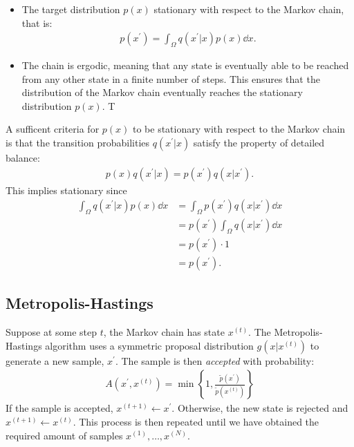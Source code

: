 \begin{itemize}
    \item The target distribution $p(x)$ stationary with respect to the Markov chain, that is:
    \begin{align} \label{eq:stationarity}
        p(x^\prime) = \int_{\Omega} q(x^\prime| x) p(x) \dd{x}.
    \end{align}

    \item The chain is ergodic, meaning that any state is eventually able to be reached from any other state in a finite number of steps. This ensures that the distribution of the Markov chain eventually reaches the stationary distribution $p(x)$. T

\end{itemize}
A sufficent criteria for $p(x)$ to be stationary with respect to the Markov chain is that the transition probabilities $q(x^\prime|x)$ satisfy the property of detailed balance:
\begin{align*}
    p(x)q(x^\prime | x) = p(x^\prime)q(x| x^\prime).
\end{align*}
This implies stationary since
\begin{equation}
    \begin{aligned}    
        \int_{\Omega} q(x^\prime | x) p(x) \dd{x} 
        &= \int_{\Omega}  p(x^\prime)q(x| x^\prime) \dd{x} \\ 
        &=  p(x^\prime) \int_{\Omega} q(x| x^\prime) \dd{x} \\
        &=  p(x^\prime) \cdot 1 \\
        &= p(x^\prime).
    \end{aligned}
\end{equation}
\subsection{Metropolis-Hastings}

Suppose at some step $t$, the Markov chain has state $x^{(t)}$. The Metropolis-Hastings algorithm uses a symmetric proposal distribution $g(x|x^{(t)})$ to generate a new sample, $x^\prime$. The sample is then \emph{accepted} with probability:
\begin{align}
    A(x^{\prime}, x^{(t)}) = \min\left\{1, \frac{\tilde{p}(x^\prime)}{\tilde{p}(x^{(t)})}\right\}
\end{align}
If the sample is accepted, $x^{(t+1)} \gets x^\prime$. Otherwise, the new state is rejected and $x^{(t+1)} \gets x^{(t)}$. This process is then repeated until we have obtained the required amount of samples $x^{(1)},\dots,x^{(N)}$. 


